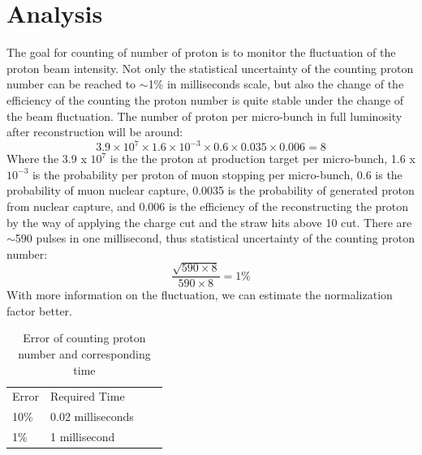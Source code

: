 \documentclass[12pt]{extarticle}
\begin{document}
\section{Analysis}
The goal for counting of number of proton is to monitor the fluctuation of the proton beam intensity. Not only the statistical uncertainty of the counting proton number can be reached to $\sim$1\% in milliseconds scale, but also the change of the efficiency of the counting the proton number is quite stable under the change of the beam fluctuation.
\noindent The number of proton per micro-bunch in full luminosity after reconstruction will be around: 
\[ 3.9 \times 10 ^7 \times 1.6 \times 10^{-3} \times 0.6 \times 0.035 \times 0.006  = 8 \]
Where the 3.9 x $10^{7}$ is the the proton at production target per micro-bunch, 
1.6 x $10^{-3}$ is the probability per proton of muon stopping per micro-bunch, 
0.6 is the probability of muon nuclear capture, 0.0035 is the probability of generated proton from nuclear capture, and 0.006 is the efficiency of the reconstructing the proton by the way of applying the charge cut and the straw hits above 10 cut. There are $\sim$590 pulses in one millisecond, thus statistical uncertainty of the counting proton number:
\[
     \frac{ \sqrt{590 \times 8}  }{ 590 \times 8} = 1 \%
\]
\noindent With more information on the fluctuation, we can estimate the normalization factor better.

\begin{table}[!h]
\centering
\begin{tabular}{llll}
Error & Required Time   \\
10\%    &  0.02 milliseconds \\
1\%     &  1 millisecond   \\
\end{tabular}
\caption{Error of counting proton number and corresponding time}
\label{equip1}
\end{table}
\end{document}

